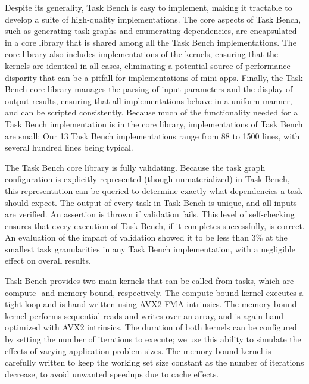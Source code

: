 Despite its generality, Task Bench is easy to implement, making it
tractable to develop a suite of high-quality implementations. The core aspects of Task Bench, such as generating
task graphs and enumerating dependencies, are encapsulated in a core
library that is shared among all the Task Bench implementations. The
core library also includes implementations of the kernels, ensuring
that the kernels are identical in all cases, eliminating a potential
source of performance disparity that can be a pitfall for
implementations of mini-apps. Finally, the Task Bench core library manages the
parsing of input parameters and the display of output results,
ensuring that all implementations behave in a uniform manner, and can
be scripted consistently. Because much of the functionality needed for
a Task Bench implementation is in the core library, implementations of
Task Bench are small: Our 13 Task Bench implementations range from 88
to 1500 lines, with several hundred lines being typical.

The Task Bench core library is fully
validating. Because the task graph configuration is explicitly
represented (though unmaterialized) in Task Bench, this representation
can be queried to determine exactly what dependencies a task should
expect. The output of every task in Task Bench is unique,
and all inputs are verified. An assertion is thrown if validation
fails. This level of self-checking ensures that every execution of Task Bench, if it
completes successfully, is correct. An evaluation of the impact of
validation showed it to be less than 3\% at the smallest task
granularities in any Task Bench implementation, with a negligible
effect on overall results.

Task Bench provides two main kernels that can be called from tasks,
which are compute- and memory-bound, respectively. The compute-bound
kernel executes a tight loop and is hand-written using AVX2 FMA
intrinsics. The memory-bound kernel performs sequential reads and
writes over an array, and is again hand-optimized with AVX2
intrinsics. The duration of both kernels can be configured by setting
the number of iterations to execute; we use this ability to simulate
the effects of varying application problem sizes. The memory-bound
kernel is carefully written to keep the working set size constant as
the number of iterations decrease, to avoid unwanted speedups due to
cache effects.

